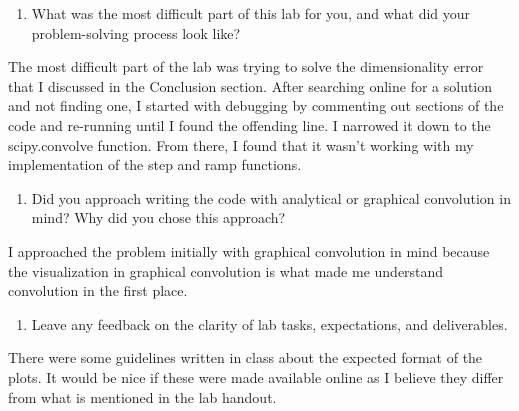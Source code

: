 \documentclass[12pt]{article}
\begin{document}
\begin{enumerate}[resume]
    \item What was the most difficult part of this lab for you, and what did your problem-solving process look like?
\end{enumerate}
    \par The most difficult part of the lab was trying to solve the dimensionality error that I discussed in the Conclusion section. After searching online for a solution and not finding one, I started with debugging by commenting out sections of the code and re-running until I found the offending line. I narrowed it down to the scipy.convolve function. From there, I found that it wasn't working with my implementation of the step and ramp functions.
    
\begin{enumerate}[resume]
    \item Did you approach writing the code with analytical or graphical convolution in mind?  Why did you chose this approach?
\end{enumerate}
    \par I approached the problem initially with graphical convolution in mind because the visualization in graphical convolution is what made me understand convolution in the first place.
    
\begin{enumerate}[resume]
    \item Leave any feedback on the clarity of lab tasks, expectations, and deliverables.
\end{enumerate}
    \par There were some guidelines written in class about the expected format of the plots. It would be nice if these were made available online as I believe they differ from what is mentioned in the lab handout.
    
\end{document}
